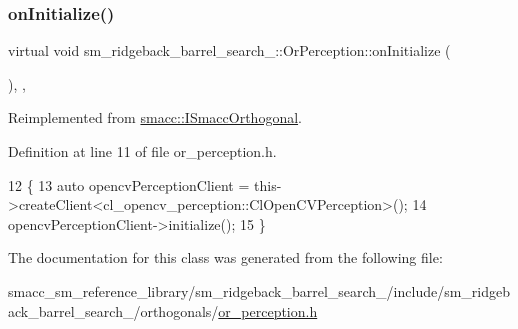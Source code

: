 \subsubsection{\texorpdfstring{on\+Initialize()}{onInitialize()}}
{\footnotesize\ttfamily virtual void sm\+\_\+ridgeback\+\_\+barrel\+\_\+search\+\_\+::\+Or\+Perception\+::on\+Initialize (\begin{DoxyParamCaption}{ }\end{DoxyParamCaption})\hspace{0.3cm}{\ttfamily [inline]}, {\ttfamily [override]}, {\ttfamily [virtual]}}



Reimplemented from \hyperlink{classsmacc_1_1ISmaccOrthogonal_a6bb31c620cb64dd7b8417f8705c79c7a}{smacc\+::\+I\+Smacc\+Orthogonal}.



Definition at line 11 of file or\+\_\+perception.\+h.


\begin{DoxyCode}
12   \{
13     \textcolor{keyword}{auto} opencvPerceptionClient = this->createClient<cl\_opencv\_perception::ClOpenCVPerception>();
14     opencvPerceptionClient->initialize();
15   \}
\end{DoxyCode}


The documentation for this class was generated from the following file\+:\begin{DoxyCompactItemize}
\item 
smacc\+\_\+sm\+\_\+reference\+\_\+library/sm\+\_\+ridgeback\+\_\+barrel\+\_\+search\+\_/include/sm\+\_\+ridgeback\+\_\+barrel\+\_\+search\+\_/orthogonals/\hyperlink{sm__ridgeback__barrel__search__1_2include_2sm__ridgeback__barrel__search__1_2orthogonals_2or__perception_8h}{or\+\_\+perception.\+h}\end{DoxyCompactItemize}
